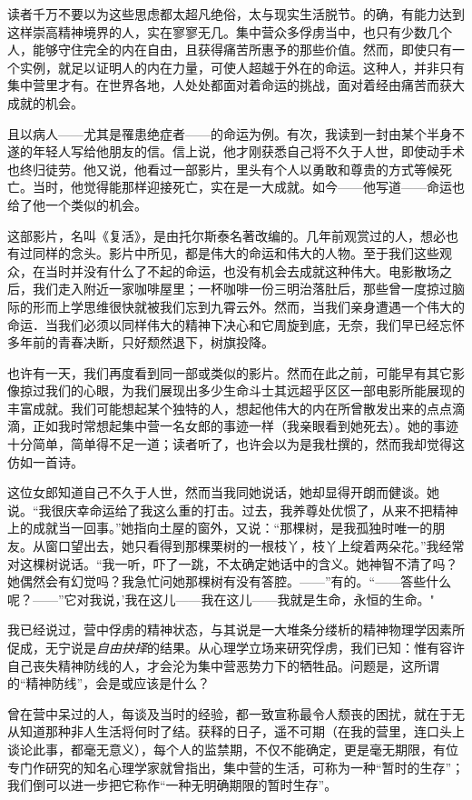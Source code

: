 \documentclass[11pt,oneside]{book}
\begin{document}
\begin{common-format}
读者千万不要以为这些思虑都太超凡绝俗，太与现实生活脱节。的确，有能力达到这样崇高精神境界的人，实在寥寥无几。集中营众多俘虏当中，也只有少数几个人，能够守住完全的内在自由，且获得痛苦所惠予的那些价值。然而，即使只有一个实例，就足以证明人的内在力量，可使人超越于外在的命运。这种人，并非只有集中营里才有。在世界各地，人处处都面对着命运的挑战，面对着经由痛苦而获大成就的机会。

且以病人——尤其是罹患绝症者——的命运为例。有次，我读到一封由某个半身不遂的年轻人写给他朋友的信。信上说，他才刚获悉自己将不久于人世，即使动手术也终归徒劳。他又说，他看过一部影片，里头有个人以勇敢和尊贵的方式等候死亡。当时，他觉得能那样迎接死亡，实在是一大成就。如今——他写道——命运也给了他一个类似的机会。

这部影片，名叫《复活》，是由托尔斯泰名著改编的。几年前观赏过的人，想必也有过同样的念头。影片中所见，都是伟大的命运和伟大的人物。至于我们这些观众，在当时并没有什么了不起的命运，也没有机会去成就这种伟大。电影散场之后，我们走入附近一家咖啡屋里；一杯咖啡一份三明治落肚后，那些曾一度掠过脑际的形而上学思维很快就被我们忘到九霄云外。然而，当我们亲身遭遇一个伟大的命运．当我们必须以同样伟大的精神下决心和它周旋到底，无奈，我们早已经忘怀多年前的青春决断，只好颓然退下，树旗投降。

也许有一天，我们再度看到同一部或类似的影片。然而在此之前，可能早有其它影像掠过我们的心眼，为我们展现出多少生命斗士其远超乎区区一部电影所能展现的丰富成就。我们可能想起某个独特的人，想起他伟大的内在所曾散发出来的点点滴滴，正如我时常想起集中营一名女郎的事迹一样（我亲眼看到她死去）。她的事迹十分简单，简单得不足一道；读者听了，也许会以为是我杜撰的，然而我却觉得这仿如一首诗。

这位女郎知道自己不久于人世，然而当我同她说话，她却显得开朗而健谈。她说。“我很庆幸命运给了我这么重的打击。过去，我养尊处优惯了，从来不把精神上的成就当一回事。”她指向土屋的窗外，又说：“那棵树，是我孤独时唯一的朋友。从窗口望出去，她只看得到那棵栗树的一根枝丫，枝丫上绽着两朵花。”我经常对这棵树说话。“我一听，吓了一跳，不太确定她话中的含义。她神智不清了吗？她偶然会有幻觉吗？我急忙问她那棵树有没有答腔。——”有的。“——答些什么呢？——”它对我说，'我在这儿——我在这儿——我就是生命，永恒的生命。"

我已经说过，营中俘虏的精神状态，与其说是一大堆条分缕析的精神物理学因素所促成，无宁说是\emph{自由抉择}的结果。从心理学立场来研究俘虏，我们已知：惟有容许自己丧失精神防线的人，才会沦为集中营恶势力下的牺牲品。问题是，这所谓的“精神防线”，会是或应该是什么？

曾在营中呆过的人，每谈及当时的经验，都一致宣称最令人颓丧的困扰，就在于无从知道那种非人生活将何时了结。获释的日子，遥不可期（在我的营里，连口头上谈论此事，都毫无意义），每个人的监禁期，不仅不能确定，更是毫无期限，有位专门作研究的知名心理学家就曾指出，集中营的生活，可称为一种“暂时的生存”；我们倒可以进一步把它称作“一种无明确期限的暂时生存”。


\end{common-format}
\end{document}
